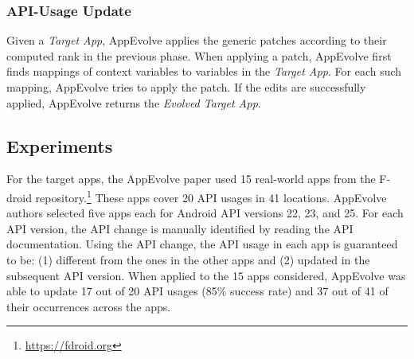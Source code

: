 \subsubsection{API-Usage Update}
Given a {\em Target App}, AppEvolve applies the generic patches according to their computed rank in the previous phase. When applying a patch, AppEvolve first finds mappings of context variables to variables in the {\em Target App}. For each such mapping, AppEvolve tries to apply the patch. If the edits are successfully applied, AppEvolve returns the {\em Evolved Target App}.

\subsection{Experiments}
For the target apps, the AppEvolve paper used 15 real-world apps from the F-droid repository.\footnote{\url{https://fdroid.org}} These  apps cover 20 API usages in 41 locations. AppEvolve authors selected five apps each for Android API versions 22, 23, and 25. For each API version, the API change is manually identified by reading the API
documentation. Using the API change, the API usage in each app is guaranteed to be: (1) different from the ones in the other apps and (2)
updated in the subsequent API version. 
When applied to the 15 apps considered, AppEvolve was able to update 17 out of 20 API usages (85\% success rate) and 37 out of 41 of their occurrences across the apps.

